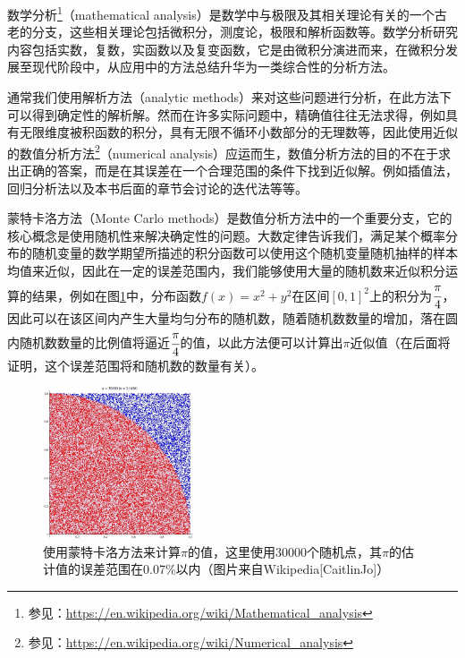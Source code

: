 数学分析\footnote{参见：\url{https://en.wikipedia.org/wiki/Mathematical_analysis}}（mathematical analysis）是数学中与极限及其相关理论有关的一个古老的分支，这些相关理论包括微积分，测度论，极限和解析函数等。数学分析研究内容包括实数，复数，实函数以及复变函数，它是由微积分演进而来，在微积分发展至现代阶段中，从应用中的方法总结升华为一类综合性的分析方法。

通常我们使用解析方法（analytic methods）来对这些问题进行分析，在此方法下可以得到确定性的解析解。然而在许多实际问题中，精确值往往无法求得，例如具有无限维度被积函数的积分，具有无限不循环小数部分的无理数等，因此使用近似的数值分析方法\footnote{参见：\url{https://en.wikipedia.org/wiki/Numerical_analysis}}（numerical analysis）应运而生，数值分析方法的目的不在于求出正确的答案，而是在其误差在一个合理范围的条件下找到近似解。例如插值法，回归分析法以及本书后面的章节会讨论的迭代法等等。

蒙特卡洛方法（Monte Carlo methods）是数值分析方法中的一个重要分支，它的核心概念是使用随机性来解决确定性的问题。大数定律告诉我们，满足某个概率分布的随机变量的数学期望所描述的积分函数可以使用这个随机变量随机抽样的样本均值来近似，因此在一定的误差范围内，我们能够使用大量的随机数来近似积分运算的结果，例如在图\ref{f:mc-pi}中，分布函数$f(x)=x^2+y^2$在区间$[0,1]^2$上的积分为$ \cfrac{\pi}{4}$，因此可以在该区间内产生大量均匀分布的随机数，随着随机数数量的增加，落在圆内随机数数量的比例值将逼近$ \cfrac{\pi}{4}$的值，以此方法便可以计算出$\pi$近似值（在后面将证明，这个误差范围将和随机数的数量有关）。

\begin{figure}
	\sidecaption
	\includegraphics[width=0.4\textwidth]{figures/mc/pi}
	\caption{使用蒙特卡洛方法来计算$\pi$的值，这里使用30000个随机点，其$\pi$的估计值的误差范围在0.07\%以内（图片来自Wikipedia[CaitlinJo]）}
	\label{f:mc-pi}
\end{figure}

